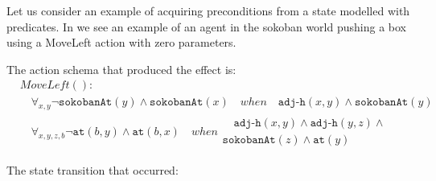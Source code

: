 \documentclass[../Master.tex]{subfiles}
\begin{document}
\begin{thm-sokoban-example-initial-precond}\label{thm:sokoban-example-initial-precond}
Let us consider an example of acquiring preconditions from a state modelled with predicates. In  we see an example of an agent in the sokoban world pushing a box using a MoveLeft action with zero parameters.

The action schema that produced the effect is:
\begin{align*}
&MoveLeft():&  \\
&\quad \forall_{x, y}  \neg\texttt{sokobanAt}(y) \land \texttt{sokobanAt}(x) \quad when \quad \texttt{adj-h}(x,y) \land \texttt{sokobanAt}(y)& \\
&\quad \forall_{x, y, z, b} \neg\texttt{at}(b,y) \land \texttt{at}(b,x) \quad when 
			\begin{gathered} 
				\quad \texttt{adj-h}(x,y) \land \texttt{adj-h}(y,z) \land \\ 
					  \texttt{sokobanAt}(z) \land \texttt{at}(y) 
			\end{gathered}&
\end{align*}

The state transition that occurred:


\end{thm-sokoban-example-initial-precond}
\end{document}
